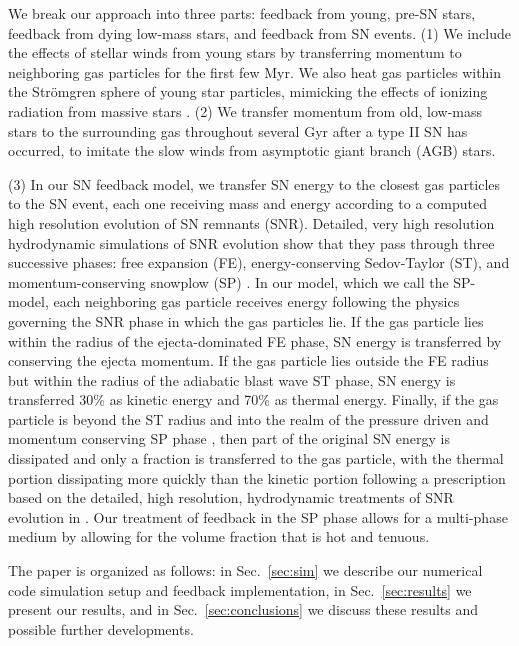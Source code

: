 \documentclass[iop]{emulateapj}
\begin{document}
We break our approach into three parts: feedback from young, pre-SN stars, feedback from dying low-mass stars, and feedback from SN events. (1) We include the effects of stellar winds from young stars by transferring momentum to neighboring gas particles for the first few Myr. We also heat gas particles within the Str\"omgren sphere of young star particles, mimicking the effects of ionizing radiation from massive stars \citep[see e.g.,][]{Renaud13}. (2) We transfer momentum from old, low-mass stars to the surrounding gas throughout several Gyr after a type II SN has occurred, to imitate the slow winds from asymptotic giant branch (AGB) stars.

(3) In our SN feedback model, we transfer SN energy to the closest gas particles to the SN event, each one receiving mass and energy according to a computed high resolution evolution of SN remnants (SNR). Detailed, very high resolution hydrodynamic simulations of SNR evolution \citep[see][for details and a review]{Li15} show that they pass through three successive phases: free expansion (FE), energy-conserving Sedov-Taylor (ST), and momentum-conserving snowplow (SP) \citep[see also][]{Kim15, Martizzi15, Walch15}. In our model, which we call the SP-model, each neighboring gas particle receives energy following the physics governing the SNR phase in which the gas particles lie. If the gas particle lies within the radius of the ejecta-dominated FE phase, SN energy is transferred by conserving the ejecta momentum. If the gas particle lies outside the FE radius but within the radius of the adiabatic blast wave ST phase, SN energy is transferred 30\% as kinetic energy and 70\% as thermal energy. Finally, if the gas particle is beyond the ST radius and into the realm of the pressure driven and momentum conserving SP phase \citep{Chevalier74}, then part of the original SN energy is dissipated and only a fraction is transferred to the gas particle, with the thermal portion dissipating more quickly than the kinetic portion following a prescription based on the detailed, high resolution, hydrodynamic treatments of SNR evolution in \citet{Li15}. Our treatment of feedback in the SP phase allows for a multi-phase medium by allowing for the volume fraction that is hot and tenuous.

The paper is organized as follows: in Sec.~\ref{sec:sim} we describe our numerical code simulation setup and feedback implementation, in Sec.~\ref{sec:results} we present our results, and in Sec.~\ref{sec:conclusions} we discuss these results and possible further developments.
\end{document}

